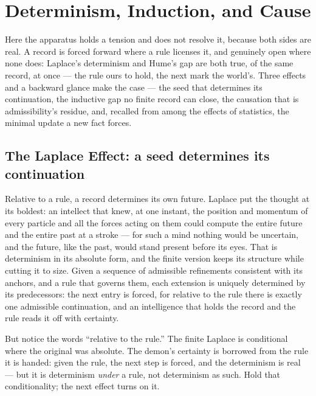 \chapter{Determinism, Induction, and Cause}
\label{chap:determinism-induction-cause}

Here the apparatus holds a tension and does not resolve it, because both sides are real. A record is forced
forward where a rule licenses it, and genuinely open where none does: Laplace's determinism and Hume's gap are
both true, of the same record, at once --- the rule ours to hold, the next mark the world's. Three effects and
a backward glance make the case --- the seed that determines its continuation, the inductive gap no finite
record can close, the causation that is admissibility's residue, and, recalled from among the effects of
statistics, the minimal update a new fact forces.

\section{The Laplace Effect: a seed determines its continuation}
\label{se:laplace}

Relative to a rule, a record determines its own future. Laplace put the thought at its boldest: an intellect
that knew, at one instant, the position and momentum of every particle and all the forces acting on them could
compute the entire future and the entire past at a stroke --- for such a mind nothing would be uncertain, and
the future, like the past, would stand present before its eyes. That is determinism in its absolute form, and
the finite version keeps its structure while cutting it to size. Given a sequence of admissible refinements
consistent with its anchors, and a rule that governs them, each extension is uniquely determined by its
predecessors: the next entry is forced, for relative to the rule there is exactly one admissible
continuation, and an intelligence that holds the record and the rule reads it off with certainty.

But notice the words ``relative to the rule.'' The finite Laplace is conditional where the original was
absolute. The demon's certainty is borrowed from the rule it is handed: given the rule, the next step is
forced, and the determinism is real --- but
it is determinism \emph{under} a rule, not determinism as such.
Hold that conditionality; the next effect turns on it.

